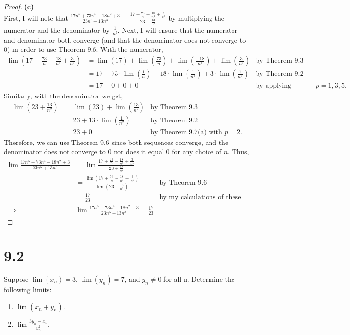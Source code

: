 \documentclass[10pt,a4paper]{article}
\theoremstyle{definition}
\begin{document}
\begin{proof}{\textbf{(c)}}
\\First, I will note that $\displaystyle \frac{17n^5 + 73n^4 - 18n^2 + 3}{23n^5 + 13n^3} = \frac{17 + \frac{73}{n} - \frac{18}{n^3} + \frac{3}{n^5}}{23 + \frac{13}{n^2}}$ by multiplying the numerator and the denominator by $\frac{1}{n^5}$. Next, I will ensure that the numerator and denominator both converge (and that the denominator does not converge to 0) in order to use Theorem 9.6. With the numerator,
\begin{align*}
\lim\left(17 + \frac{73}{n} - \frac{18}{n^3} + \frac{3}{n^5}\right) &= \lim(17) + \lim\left(\frac{73}{n}\right) + \lim\left(\frac{-18}{n^3}\right) + \lim\left(\frac{3}{n^5}\right) &\text{by Theorem 9.3}\\
&= 17 + 73\cdot \lim\left(\frac{1}{n}\right) - 18 \cdot \lim\left(\frac{1}{n^3}\right) + 3 \cdot \lim\left(\frac{1}{n^5}\right) &\text{by Theorem 9.2}\\
&= 17 + 0 + 0 + 0 &\text{by applying Theorem 9.7(a) with } p = 1, 3, 5.
\end{align*}
Similarly, with the denominator we get,
\begin{align*}
\lim\left(23 + \frac{13}{n^2}\right) &= \lim(23) + \lim\left(\frac{13}{n^2}\right) &\text{by Theorem 9.3}\\
&= 23 + 13 \cdot \lim\left(\frac{1}{n^2}\right) &\text{by Theorem 9.2}\\
&= 23 + 0 &\text{by Theorem 9.7(a) with } p = 2.
\end{align*}
Therefore, we can use Theorem 9.6 since both sequences converge, and the denominator does not converge to 0 nor does it equal 0 for any choice of $n$. Thus, 
\begin{align*}
\lim \frac{17n^5 + 73n^4 - 18n^2 + 3}{23n^5 + 13n^3} &= \lim \frac{17 + \frac{73}{n} - \frac{18}{n^3} + \frac{3}{n^5}}{23 + \frac{13}{n^2}}\\
&= \frac{\lim\left(17 + \frac{73}{n} - \frac{18}{n^3} + \frac{3}{n^5}\right)}{\lim\left(23 + \frac{13}{n^2}\right)} &\text{by Theorem 9.6}\\
&= \frac{17}{23} &\text{by my calculations of these limits}\\
\implies &\boxed{\lim \frac{17n^5 + 73n^4 - 18n^2 + 3}{23n^5 + 13n^3} = \frac{17}{23}}
\end{align*}
\end{proof}

\section*{9.2}
Suppose $\lim(x_n) = 3$, $\lim(y_n) = 7$, and $y_n \neq 0$ for all n. Determine the following limits:
\begin{enumerate}[label = (\alph*)]
\item $\displaystyle \lim(x_n + y_n)$.
\item $\displaystyle \lim \frac{3y_n - x_n}{y_n^2}$.
\end{enumerate}
\end{document}
